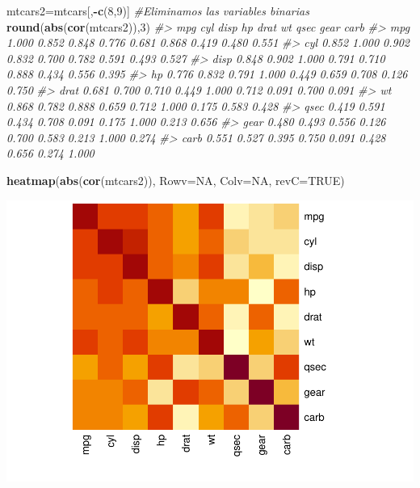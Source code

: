 \documentclass[
]{book}
\newenvironment{Shaded}{\begin{snugshade}}{\end{snugshade}}
\newcommand{\CommentTok}[1]{\textcolor[rgb]{0.56,0.35,0.01}{\textit{#1}}}
\newcommand{\DataTypeTok}[1]{\textcolor[rgb]{0.13,0.29,0.53}{#1}}
\newcommand{\DecValTok}[1]{\textcolor[rgb]{0.00,0.00,0.81}{#1}}
\newcommand{\KeywordTok}[1]{\textcolor[rgb]{0.13,0.29,0.53}{\textbf{#1}}}
\newcommand{\NormalTok}[1]{#1}
\newcommand{\OperatorTok}[1]{\textcolor[rgb]{0.81,0.36,0.00}{\textbf{#1}}}
\newcommand{\OtherTok}[1]{\textcolor[rgb]{0.56,0.35,0.01}{#1}}
\theoremstyle{definition}
\theoremstyle{definition}
\theoremstyle{definition}
\theoremstyle{remark}
\begin{document}
\begin{Shaded}
\begin{Highlighting}[]
\NormalTok{mtcars2=mtcars[,}\OperatorTok{{-}}\KeywordTok{c}\NormalTok{(}\DecValTok{8}\NormalTok{,}\DecValTok{9}\NormalTok{)]  }\CommentTok{\#Eliminamos las variables binarias}
\KeywordTok{round}\NormalTok{(}\KeywordTok{abs}\NormalTok{(}\KeywordTok{cor}\NormalTok{(mtcars2)),}\DecValTok{3}\NormalTok{)}
\CommentTok{\#\textgreater{}        mpg   cyl  disp    hp  drat    wt  qsec  gear  carb}
\CommentTok{\#\textgreater{} mpg  1.000 0.852 0.848 0.776 0.681 0.868 0.419 0.480 0.551}
\CommentTok{\#\textgreater{} cyl  0.852 1.000 0.902 0.832 0.700 0.782 0.591 0.493 0.527}
\CommentTok{\#\textgreater{} disp 0.848 0.902 1.000 0.791 0.710 0.888 0.434 0.556 0.395}
\CommentTok{\#\textgreater{} hp   0.776 0.832 0.791 1.000 0.449 0.659 0.708 0.126 0.750}
\CommentTok{\#\textgreater{} drat 0.681 0.700 0.710 0.449 1.000 0.712 0.091 0.700 0.091}
\CommentTok{\#\textgreater{} wt   0.868 0.782 0.888 0.659 0.712 1.000 0.175 0.583 0.428}
\CommentTok{\#\textgreater{} qsec 0.419 0.591 0.434 0.708 0.091 0.175 1.000 0.213 0.656}
\CommentTok{\#\textgreater{} gear 0.480 0.493 0.556 0.126 0.700 0.583 0.213 1.000 0.274}
\CommentTok{\#\textgreater{} carb 0.551 0.527 0.395 0.750 0.091 0.428 0.656 0.274 1.000}
\end{Highlighting}
\end{Shaded}

\begin{Shaded}
\begin{Highlighting}[]
\KeywordTok{heatmap}\NormalTok{(}\KeywordTok{abs}\NormalTok{(}\KeywordTok{cor}\NormalTok{(mtcars2)), }\DataTypeTok{Rowv=}\OtherTok{NA}\NormalTok{, }\DataTypeTok{Colv=}\OtherTok{NA}\NormalTok{, }\DataTypeTok{revC=}\OtherTok{TRUE}\NormalTok{) }
\end{Highlighting}
\end{Shaded}

\begin{center}\includegraphics[width=0.9\linewidth]{14cap13_EDextra_files/figure-latex/unnamed-chunk-12-1} \end{center}
\end{document}
